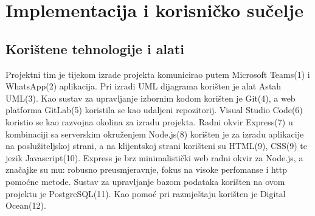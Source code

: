 \chapter{Implementacija i korisničko sučelje}
		
		
		\section{Korištene tehnologije i alati}
			
			 {Projektni tim je tijekom izrade projekta komunicirao putem Microsoft  Teams(1) i WhatsApp(2) aplikacija. Pri izradi UML dijagrama korišten je alat Astah UML(3). Kao sustav za upravljanje izbornim kodom korišten je  Git(4), a web platforma GitLab(5) koristila se kao udaljeni repozitorij.
			 Visual Studio Code(6) koristio se kao razvojna okolina za izradu projekta. Radni okvir Express(7) u kombinaciji sa serverskim okruženjem Node.js(8) korišten je za izradu aplikacije na poslužiteljskoj strani, a na klijentskoj strani korišteni su HTML(9), CSS(9) te jezik Javascript(10). Express je brz minimalistički web radni okvir za Node.js, a značajke su mu: robusno preusmjeravnje, fokus na visoke perfomanse i http pomoćne metode. Sustav za upravljanje bazom podataka korišten na ovom projektu je PostgreSQL(11). Kao pomoć pri razmještaju korišten je Digital Ocean(12).}
		 	 
